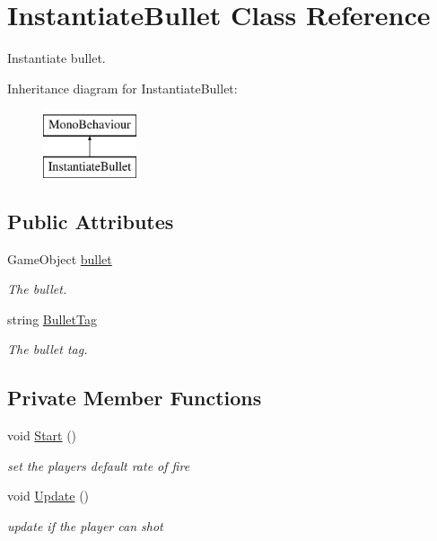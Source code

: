 \hypertarget{class_instantiate_bullet}{}\section{Instantiate\+Bullet Class Reference}
\label{class_instantiate_bullet}


Instantiate bullet.  


Inheritance diagram for Instantiate\+Bullet\+:\begin{figure}[H]
\begin{center}
\leavevmode
\includegraphics[height=2.000000cm]{class_instantiate_bullet}
\end{center}
\end{figure}
\subsection*{Public Attributes}
\begin{DoxyCompactItemize}
\item 
Game\+Object \mbox{\hyperlink{class_instantiate_bullet_a5f592b6ea8184022a425de7fb34cd1c8}{bullet}}
\begin{DoxyCompactList}\small\item\em The bullet. \end{DoxyCompactList}\item 
string \mbox{\hyperlink{class_instantiate_bullet_a3eebc503e154a693e632bf480b2209c4}{Bullet\+Tag}}
\begin{DoxyCompactList}\small\item\em The bullet tag. \end{DoxyCompactList}\end{DoxyCompactItemize}
\subsection*{Private Member Functions}
\begin{DoxyCompactItemize}
\item 
void \mbox{\hyperlink{class_instantiate_bullet_aedc5efe186e3d0ad9639c58be67088ac}{Start}} ()
\begin{DoxyCompactList}\small\item\em set the player\textquotesingle{}s default rate of fire \end{DoxyCompactList}\item 
void \mbox{\hyperlink{class_instantiate_bullet_a0a6f4639d59779ad8d5ef7de4ef5234c}{Update}} ()
\begin{DoxyCompactList}\small\item\em update if the player can shot \end{DoxyCompactList}\end{DoxyCompactItemize}
